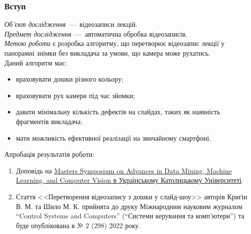 \begin{frame}
    \frametitle{Вступ}
    \textit{Об'єкт дослідження}~---~відеозаписи лекцій. \\
    \textit{Предмет дослідження}~---~автоматична обробка відеозаписів. \\
    \textit{Метою роботи} є розробка алгоритму, що перетворює
    відеозапис лекції у панорамні знімки без викладача
    за умови, що камера може рухатись. \\
    Даний алгоритм має:
    \begin{itemize}
        \item враховувати дошки різного кольору;
        \item враховувати рух камери під час зйомки;
        \item давати мінімальну кількість дефектів на слайдах,
              таких як наявність фрагментів викладача;
        \item мати можливість ефективної реалізації на звичайному смартфоні.
    \end{itemize}
    Апробація результатів роботи:
    \begin{enumerate}
        \item Доповідь на
              \href{https://s3.eu-central-1.amazonaws.com/ucu.edu.ua/wp-content/uploads/sites/8/2021/04/Creating-Slides-from-Video-Lecture.pdf}{Masters Symposium on Advances in Data Mining,
                  Machine Learning, and Computer Vision в Українському Католицькому Університеті}.
        \item Стаття <<Перетворення відеозапису з дошки у слайд-шоу>> авторів
              Кригін В. М. та Шило М. К. прийнята до друку
              Міжнародним науковим журналом “Control Systems and Computers”
              (“Системи керування та комп'ютери”) та буде опублікована в № 2 (298) 2022 року.
    \end{enumerate}
\end{frame}
